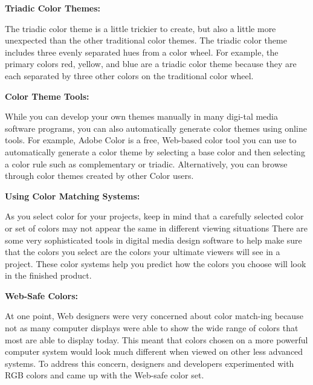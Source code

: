 \documentclass{report}
\begin{document}
          \bigbreak \noindent \bigbreak \noindent 
          \begin{large}
            \textbf{Triadic Color Themes:}
          \end{large}
          \bigbreak \noindent 
          The triadic color theme is a little trickier to create, but also a little more unexpected than the other traditional color themes. The triadic color theme includes three evenly separated hues from a color wheel. For example, the primary colors red, yellow, and blue are a triadic color theme because they are each separated by three other colors on the traditional color wheel.

          \bigbreak \noindent \bigbreak \noindent 
          \begin{large}
            \textbf{Color Theme Tools:}
          \end{large}
          
          \bigbreak \noindent 
          While you can develop your own themes manually in many digi-tal media software programs, you can also automatically generate color themes using online tools. For example, Adobe Color is a free, Web-based color tool you can use to automatically generate a color theme by selecting a base color and then selecting a color rule such as complementary or triadic.
          \bigbreak \noindent 
          Alternatively, you can browse through color themes created by other Color users.

          \bigbreak \noindent \bigbreak \noindent 
          \begin{Large}
            \textbf{Using Color Matching Systems:}
          \end{Large}
          \bigbreak \noindent 
          As you select color for your projects, keep in mind that a carefully selected color or set of colors may not appear the same in different viewing situations
          \bigbreak \noindent 
          There are some very sophisticated tools in digital media design software to help make sure that the colors you select are the colors your ultimate viewers will see in a project. These color systems help you predict how the colors you choose will look in the finished product.

          \bigbreak \noindent \bigbreak \noindent 
          \begin{large}
            \textbf{Web-Safe Colors:}
          \end{large}
          \bigbreak \noindent 
          At one point, Web designers were very concerned about color match-ing because not as many computer displays were able to show the wide range of colors that most are able to display today. This meant that colors chosen on a more powerful computer system would look much different when viewed on other less advanced systems. To address this concern, designers and developers experimented with RGB colors and came up with the Web-safe color set.
          \bigbreak \noindent 
\end{document}
